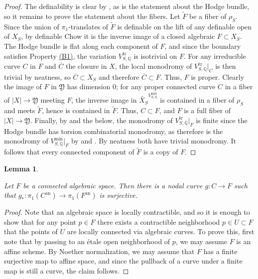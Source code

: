 \documentclass{amsart}
\newcommand{\customref}[2]{\hyperref[#1]{#2}}
\newcommand{\an}{\operatorname{an}}
\newcommand{\ol}{\overline}
\newtheorem{lem}[theorem]{Lemma}
\theoremstyle{definition}
\theoremstyle{remark}
\def\bQ{\mathbb{Q}}
\def\an{\mathrm{an}}
\def\trans{\mathrm{tr}}
\def\mini{\mathrm{min}}
\renewcommand{\bar}[1]{\ol{#1}}
\def\fY{\mathfrak{Y}}
\numberwithin{equation}{section}
\begin{document}
\begin{proof}The definability is clear by \cite{BMull}, as is the statement about the Hodge bundle, so it remains to prove the statement about the fibers.  Let $\widetilde {F}$ be a fiber of $\rho_S$.  Since the union of $\pi_1$-translates of $\widetilde {F}$ is definable on the lift of any definable open of $X_S$, by definable Chow \cite[Corollary 4.5]{definechow} it is the inverse image of a closed algebraic $F\subset X_S$.  The Hodge bundle is flat along each component of $F$, and since the boundary satisfies Property \customref{b1}{(B1)}, the variation $V^\trans_{S,\bQ}$ is isotrivial on $F$.  For any irreducible curve $C$ in $F$ and $\bar C$ the closure in $X$, the local monodromy of $V^\trans_{S,\bQ}|_C$ is then trivial by neatness, so $\bar C\subset X_S$ and therefore $\bar C\subset F$.  Thus, $F$ is proper.  Clearly the image of $F$ in $\fY$ has dimension 0; for any proper connected curve $C$ in a fiber of $|X|\to\fY$ meeting $F$, the inverse image in $\widetilde{X_S}^{V^{\mini}_{S,\bQ}}$ is contained in a fiber of $\rho_S$ and meets $\widetilde {F}$, hence is contained in $\widetilde{F}$. Thus, $C\subset F$, and $F$ is a full fiber of $|X|\to\fY$.  Finally, by  and the  below, the monodromy of $V^\trans_{S,\bQ}|_F$ is finite since the Hodge bundle has torsion combinatorial monodromy, as therefore is the monodromy of $V^\mini_{S,\bQ}|_F$ by  and .  By neatness both have trivial monodromy.  It follows that every connected component of $\widetilde{ F}$ is a copy of $F$. \end{proof}
\begin{lem}\label{lem:nodal curve monodromy}

Let $F$ be a connected algebraic space.  Then there is a nodal curve $g:C\to F$ such that $g_*:\pi_1(C^\an)\to \pi_1(F^\an)$ is surjective.
\end{lem}

\begin{proof}

Note that an algebraic space is locally contractible, and so it is enough to show that for any point $p\in F$ there exists a contractible neighborhood $p\in U\subset F$ that the points of $U$ are locally connected via algebraic curves. 
To prove this, first note that by passing to an \'etale open neighborhood of $p$, we may assume $F$ is an affine scheme.  By Noether normalization, we may assume that $F$ has a finite surjective map to affine space, and since the pullback of a curve under a finite map is still a curve, the claim follows.
\end{proof}
\end{document}
